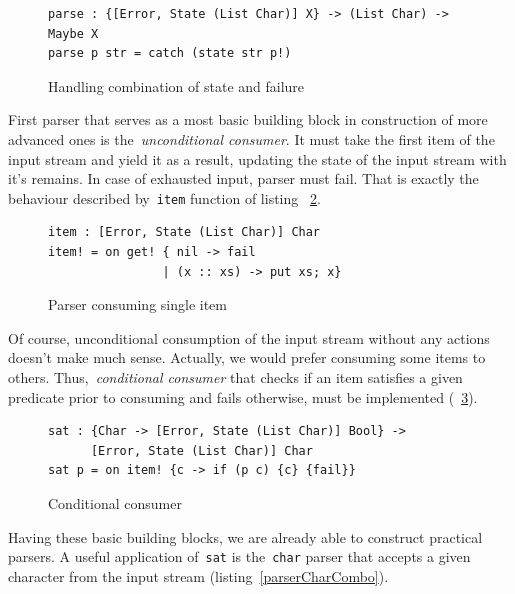     \begin{figure}[h]
    \begin{lstlisting}
parse : {[Error, State (List Char)] X} -> (List Char) -> Maybe X
parse p str = catch (state str p!)
    \end{lstlisting}
    \caption{Handling combination of state and failure}
    \label{listing:parserHandlerCombo}
    \end{figure}

    First parser that serves as a most basic building block in construction of
    more advanced ones is the~\emph{unconditional consumer}.
    It must take the first item
    of the input stream and yield it as a result, updating the state of the input
    stream with it's remains. In case of exhausted input, parser must fail. That
    is exactly the behaviour described by~\lstinline{item} function of listing
    ~\ref{listing:parserItemCombo}.

    \begin{figure}[h]
    \begin{lstlisting}
item : [Error, State (List Char)] Char
item! = on get! { nil -> fail
                | (x :: xs) -> put xs; x}
    \end{lstlisting}
    \caption{Parser consuming single item}
    \label{listing:parserItemCombo}
    \end{figure}

    Of course, unconditional consumption of the input stream without any actions
    doesn't make much sense. Actually, we would prefer consuming some items to others. Thus,~\emph{conditional consumer} that checks if an item satisfies a
    given predicate prior to consuming and fails otherwise, must be
    implemented (~\ref{listing:parserSatCombo}).

    \begin{figure}[h]
    \begin{lstlisting}
sat : {Char -> [Error, State (List Char)] Bool} ->
      [Error, State (List Char)] Char
sat p = on item! {c -> if (p c) {c} {fail}}
    \end{lstlisting}
    \caption{Conditional consumer}
    \label{listing:parserSatCombo}
    \end{figure}

    Having these basic building blocks, we are already able to construct
    practical parsers. A useful application of~\texttt{sat} is
    the~\texttt{char} parser that accepts a given character from the input
    stream (listing~\ref{parserCharCombo}).


